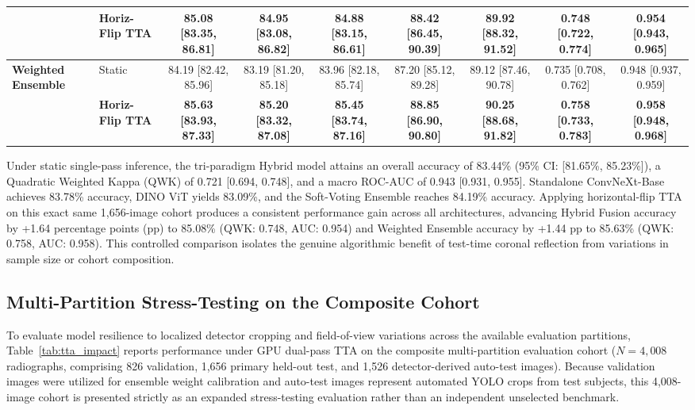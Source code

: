 \documentclass[10pt,journal]{IEEEtran}
\begin{document}
\begin{table}[t]
{\begin{tabular}{llccccccc}
& \textbf{Horiz-Flip TTA} & \textbf{85.08 [83.35, 86.81]} & \textbf{84.95 [83.08, 86.82]} & \textbf{84.88 [83.15, 86.61]} & \textbf{88.42 [86.45, 90.39]} & \textbf{89.92 [88.32, 91.52]} & \textbf{0.748 [0.722, 0.774]} & \textbf{0.954 [0.943, 0.965]} \\
\midrule
\multirow{2}{*}{\textbf{Weighted Ensemble}} 
& Static & 84.19 [82.42, 85.96] & 83.19 [81.20, 85.18] & 83.96 [82.18, 85.74] & 87.20 [85.12, 89.28] & 89.12 [87.46, 90.78] & 0.735 [0.708, 0.762] & 0.948 [0.937, 0.959] \\
& \textbf{Horiz-Flip TTA} & \textbf{85.63 [83.93, 87.33]} & \textbf{85.20 [83.32, 87.08]} & \textbf{85.45 [83.74, 87.16]} & \textbf{88.85 [86.90, 90.80]} & \textbf{90.25 [88.68, 91.82]} & \textbf{0.758 [0.733, 0.783]} & \textbf{0.958 [0.948, 0.968]} \\
\bottomrule
\end{tabular}%
}
\end{table}

Under static single-pass inference, the tri-paradigm Hybrid model attains an overall accuracy of 83.44\% (95\% CI: [81.65\%, 85.23\%]), a Quadratic Weighted Kappa (QWK) of 0.721 [0.694, 0.748], and a macro ROC-AUC of 0.943 [0.931, 0.955]. Standalone ConvNeXt-Base achieves 83.78\% accuracy, DINO ViT yields 83.09\%, and the Soft-Voting Ensemble reaches 84.19\% accuracy. Applying horizontal-flip TTA on this exact same 1,656-image cohort produces a consistent performance gain across all architectures, advancing Hybrid Fusion accuracy by +1.64 percentage points (pp) to 85.08\% (QWK: 0.748, AUC: 0.954) and Weighted Ensemble accuracy by +1.44 pp to 85.63\% (QWK: 0.758, AUC: 0.958). This controlled comparison isolates the genuine algorithmic benefit of test-time coronal reflection from variations in sample size or cohort composition.

\subsection{Multi-Partition Stress-Testing on the Composite Cohort}
\label{subsec:tta_impact}

To evaluate model resilience to localized detector cropping and field-of-view variations across the available evaluation partitions, Table~\ref{tab:tta_impact} reports performance under GPU dual-pass TTA on the composite multi-partition evaluation cohort ($N = 4{,}008$ radiographs, comprising 826 validation, 1,656 primary held-out test, and 1,526 detector-derived auto-test images). Because validation images were utilized for ensemble weight calibration and auto-test images represent automated YOLO crops from test subjects, this 4,008-image cohort is presented strictly as an expanded stress-testing evaluation rather than an independent unselected benchmark.
\end{document}
